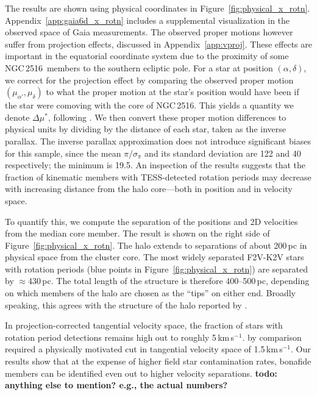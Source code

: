 \documentclass[12pt,twocolumn,tighten]{aastex63}
\newcommand{\cn}{NGC\,2516} %
\newcommand{\kms}{\,km\,s$^{-1}$}
\begin{document}
The results are shown using physical coordinates in
Figure~\ref{fig:physical_x_rotn}.  Appendix~\ref{app:gaia6d_x_rotn}
includes a supplemental visualization in the observed space of Gaia
measurements.  The observed proper motions however suffer from
projection effects, discussed in Appendix~\ref{app:vproj}.  These
effects are important in the equatorial coordinate system due to the
proximity of some \cn\ members to the southern ecliptic pole.  For a
star at position $(\alpha, \delta)$, we correct for the projection
effect by comparing the observed proper motion $(\mu_{\alpha'},
\mu_\delta)$ to what the proper motion at the star's position would
have been if the star were comoving with the core of \cn.  This yields
a quantity we denote $\Delta \mu^{*}$, following
.  We then convert these proper motion
differences to physical units by dividing by the distance of each
star, taken as the inverse parallax.  The inverse parallax
approximation does not introduce significant biases for this sample,
since the mean $\pi/\sigma_\pi$ and its standard deviation are 122 and
40 respectively; the minimum is 19.5.  An inspection of the results
suggests that the fraction of kinematic members with TESS-detected
rotation periods may decrease with increasing distance from the halo
core---both in position and in velocity space.  


To quantify this, we compute the separation of the positions and 2D
velocities from the median  core
member.  The result is shown on the right side of
Figure~\ref{fig:physical_x_rotn}.  The halo extends to separations of
about 200\,pc in physical space from the cluster core.  The most
widely separated F2V-K2V stars with rotation periods (blue points in
Figure~\ref{fig:physical_x_rotn}) are separated by $\approx$430\,pc.
The total length of the structure is therefore 400--500\,pc, depending
on which members of the halo are chosen as the ``tips'' on either end.
Broadly speaking, this agrees with the structure of the halo reported
by .

In projection-corrected tangential velocity space, the fraction of
stars with rotation period detections remains high out to roughly
5\kms.  \citet{meingast_2021} by comparison required a physically
motivated cut in tangential velocity space of 1.5\kms.  Our results
show that at the expense of higher field star contamination rates,
bonafide members can be identified even out to higher velocity
separations.  {\bf todo: anything else to mention? e.g., the actual
numbers?}
\end{document}
